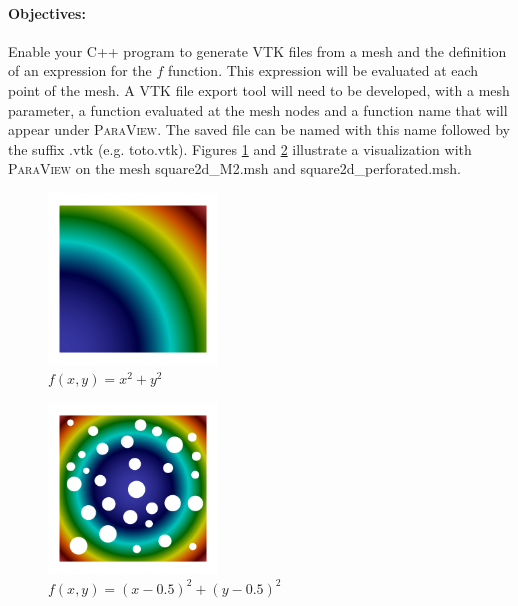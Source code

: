 \documentclass[english,10pt,a4paper]{article}
\begin{document}
\paragraph{Objectives:} Enable your C++ program to generate VTK files from a mesh and the definition of an expression for the $f$ function. This expression
will be evaluated at each point of the mesh. A VTK file export tool will need to be developed, with a mesh parameter, a function evaluated at the mesh nodes
and a function name that will appear under \textsc{ParaView}. The saved file can be named with this name followed by the suffix .vtk (e.g. toto.vtk).
Figures \ref{fig:mesh_square2d_M2_export} and \ref{fig:mesh_square2d_perforated_export} illustrate a visualization with \textsc{ParaView} on the mesh square2d\_M2.msh and square2d\_perforated.msh.

\begin{multicols}{2}
  \begin{figure}[H]
    \centering
    \includegraphics[width=0.4\textwidth]{docs/modules/ROOT/images/square2d_M2_export.png}
    \caption{$f(x,y)=x^2+y^2$}
    \label{fig:mesh_square2d_M2_export}
  \end{figure}
  \columnbreak
  \begin{figure}[H]
    \centering
    \includegraphics[width=0.4\textwidth]{docs/modules/ROOT/images/square2d_perforated_export.png}
    \caption{$f(x,y)=(x-0.5)^2+(y-0.5)^2$}
    \label{fig:mesh_square2d_perforated_export}
  \end{figure}
\end{multicols}
\end{document}
